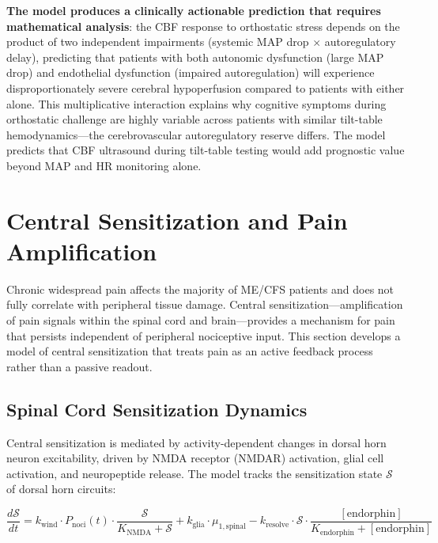 \textbf{The model produces a clinically actionable prediction that requires mathematical analysis}: the CBF response to orthostatic stress depends on the product of two independent impairments (systemic MAP drop $\times$ autoregulatory delay), predicting that patients with both autonomic dysfunction (large MAP drop) and endothelial dysfunction (impaired autoregulation) will experience disproportionately severe cerebral hypoperfusion compared to patients with either alone. This multiplicative interaction explains why cognitive symptoms during orthostatic challenge are highly variable across patients with similar tilt-table hemodynamics---the cerebrovascular autoregulatory reserve differs. The model predicts that CBF ultrasound during tilt-table testing would add prognostic value beyond MAP and HR monitoring alone.

\section{Central Sensitization and Pain Amplification}
\label{sec:central-sensitization-model}

Chronic widespread pain affects the majority of ME/CFS patients and does not fully correlate with peripheral tissue damage. Central sensitization---amplification of pain signals within the spinal cord and brain---provides a mechanism for pain that persists independent of peripheral nociceptive input. This section develops a model of central sensitization that treats pain as an active feedback process rather than a passive readout.

\subsection{Spinal Cord Sensitization Dynamics}

Central sensitization is mediated by activity-dependent changes in dorsal horn neuron excitability, driven by NMDA receptor (NMDAR) activation, glial cell activation, and neuropeptide release. The model tracks the sensitization state $\mathcal{S}$ of dorsal horn circuits:

\begin{equation}
\label{eq:central-sensitization}
\frac{d\mathcal{S}}{dt} = k_{\text{wind}} \cdot P_{\text{noci}}(t) \cdot \frac{\mathcal{S}}{K_{\text{NMDA}} + \mathcal{S}} + k_{\text{glia}} \cdot \mu_{1,\text{spinal}} - k_{\text{resolve}} \cdot \mathcal{S} \cdot \frac{[\text{endorphin}]}{K_{\text{endorphin}} + [\text{endorphin}]}
\end{equation}

